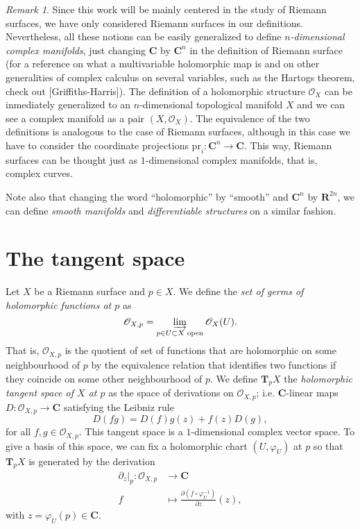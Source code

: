 \documentclass[12pt,a4paper]{book}
\theoremstyle{definition} \newtheorem{defn}[thm]{Definition}
\theoremstyle{definition} \newtheorem{ejemplo}[thm]{Example}
\theoremstyle{definition} \newtheorem{ejercicio}[thm]{Exercise}
\theoremstyle{remark} \newtheorem*{obs}{Remark}
\def\pr{\mathrm{pr}}
\def\CC{\mathbf{C}}
\def\RR{\mathbf{R}}
\def\TT{\mathbf{T}}
\def\OO{\mathscr{O}}
\begin{document}
\begin{obs}
  Since this work will be mainly centered in the study of Riemann surfaces, we have only considered Riemann surfaces in our definitions. Nevertheless, all these notions can be easily generalized to define \emph{$n$-dimensional complex manifolds}, just changing $\CC$ by $\CC^n$ in the definition of Riemann surface (for a reference on what a multivariable holomorphic map is and on other generalities of complex calculus on several variables, such as the Hartogs theorem, check out [Griffiths-Harris]). The definition of a holomorphic structure $\OO_X$ can be inmediately generalized to an $n$-dimensional topological manifold $X$ and we can see a complex manifold as a pair $(X,\OO_X)$. The equivalence of the two definitions is analogous to the case of Riemann surfaces, although in this case we have to consider the coordinate projections $\pr_i:\CC^n\rightarrow \CC$. This way, Riemann surfaces can be thought just as $1$-dimensional complex manifolds, that is, complex curves.

  Note also that changing the word ``holomorphic'' by ``smooth'' and $\CC^n$ by $\RR^{2n}$, we can define \emph{smooth manifolds} and \emph{differentiable structures} on a similar fashion.
\end{obs}

\section{The tangent space}
Let $X$ be a Riemann surface and $p\in X$. We define the \emph{set of germs of holomorphic functions at $p$} as
\begin{equation*}
  \OO_{X,p} = \varinjlim_{p\in U\subset X \text{ open}} \OO_X(U).
\end{equation*}
That is, $\OO_{X,p}$ is the quotient of set of functions that are holomorphic on some neighbourhood of $p$ by the equivalence relation that identifies two functions if they coincide on some other neighbourhood of $p$. We define $\TT_p X$ the \emph{holomorphic tangent space of $X$ at $p$} as the space of derivations on $\OO_{X,p}$; i.e. $\CC$-linear maps $D:\OO_{X,p} \rightarrow \CC$ satisfying the Leibniz rule
\begin{equation*}
  D(fg)=D(f)g(z) + f(z)D(g),
\end{equation*}
for all $f,g \in \OO_{X,p}$. This tangent space is a $1$-dimensional complex vector space. To give a basis of this space, we can fix a holomorphic chart $(U,\varphi_U)$ at $p$ so that $\TT_pX$ is generated by the derivation
\begin{align*}
  \partial_z|_p :\OO_{X,p}&\longrightarrow \CC\\ 
  f &\longmapsto \frac{\partial(f\circ \varphi_U^{-1})}{\partial z}(z), 
  \end{align*}
  with $z=\varphi_U(p)\in \CC$.
\end{document}
